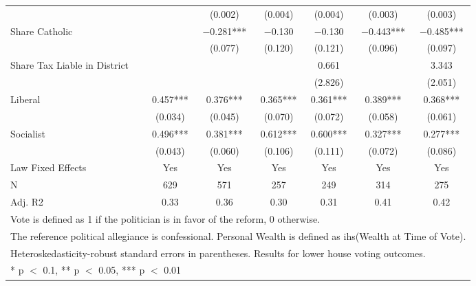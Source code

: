 \begin{table}[!h]
{\begin{tabular}[t]{lcccccc}
 &  & (\num{0.002}) & (\num{0.004}) & (\num{0.004}) & (\num{0.003}) & (\num{0.003})\\
Share Catholic &  & \num{-0.281}*** & \num{-0.130} & \num{-0.130} & \num{-0.443}*** & \num{-0.485}***\\
 &  & (\num{0.077}) & (\num{0.120}) & (\num{0.121}) & (\num{0.096}) & (\num{0.097})\\
Share Tax Liable in District &  &  &  & \num{0.661} &  & \num{3.343}\\
 &  &  &  & (\num{2.826}) &  & (\num{2.051})\\
Liberal & \num{0.457}*** & \num{0.376}*** & \num{0.365}*** & \num{0.361}*** & \num{0.389}*** & \num{0.368}***\\
 & (\num{0.034}) & (\num{0.045}) & (\num{0.070}) & (\num{0.072}) & (\num{0.058}) & (\num{0.061})\\
Socialist & \num{0.496}*** & \num{0.381}*** & \num{0.612}*** & \num{0.600}*** & \num{0.327}*** & \num{0.277}***\\
 & (\num{0.043}) & (\num{0.060}) & (\num{0.106}) & (\num{0.111}) & (\num{0.072}) & (\num{0.086})\\
\midrule
Law Fixed Effects & Yes & Yes & Yes & Yes & Yes & Yes\\
N & \num{629} & \num{571} & \num{257} & \num{249} & \num{314} & \num{275}\\
Adj. R2 & \num{0.33} & \num{0.36} & \num{0.30} & \num{0.31} & \num{0.41} & \num{0.42}\\
\bottomrule
\multicolumn{7}{l}{\rule{0pt}{1em}Vote is defined as 1 if the politician is in favor of the reform, 0 otherwise.}\\
\multicolumn{7}{l}{\rule{0pt}{1em}The reference political allegiance is confessional. Personal Wealth is defined as ihs(Wealth at Time of Vote).}\\
\multicolumn{7}{l}{\rule{0pt}{1em}Heteroskedasticity-robust standard errors in parentheses. Results for lower house voting outcomes.}\\
\multicolumn{7}{l}{\rule{0pt}{1em}* p $<$ 0.1, ** p $<$ 0.05, *** p $<$ 0.01}\\
\end{tabular}}
\end{table}
